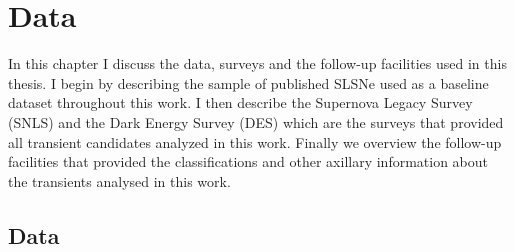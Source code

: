 
\chapter{Data} %
\label{Chapter2}

In this chapter I discuss the data, surveys and the follow-up facilities used in this thesis. I begin by describing the sample of published SLSNe used as a baseline dataset throughout this work. I then describe the Supernova Legacy Survey (SNLS) and the Dark Energy Survey (DES) which are the surveys that provided all transient candidates analyzed in this work. Finally we overview the follow-up facilities that provided the classifications and other axillary information about the transients analysed in this work. 

\section{Data}
